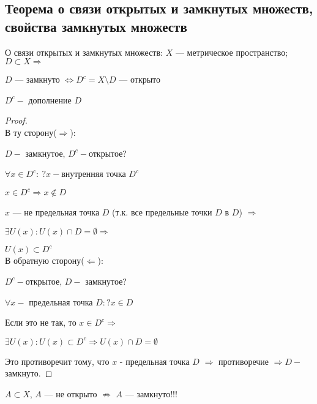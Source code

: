 \newpage
\subsection{Теорема о связи открытых и замкнутых множеств, свойства замкнутых множеств}
    \begin{theorem}{О связи открытых и замкнутых множеств:}
            $X$ --- метрическое пространство; $D \subset X \Rightarrow$
            
            $D$ --- замкнуто $ \Leftrightarrow D^{c} = X \setminus D$ ---  открыто
            
            $D^{c}-$ дополнение $D$
    \end{theorem}
    \begin{proof}$ $\\
    В ту сторону($\Rightarrow$):
    
        $D-$ замкнутое, $D^{c}-$открытое?
        
        $\forall x \in D^{c} : \  ? x-$внутренняя точка $D^{c}$
        
        $x \in D^{c} \Rightarrow  x \notin D$
        
        $x$ --- не предельная точка $D$ (т.к. все предельные точки $D$ в $D$) $\Rightarrow$
        
        $\exists U(x) : U(x) \cap D = \emptyset \Rightarrow$
    
        $U(x) \subset D^{c}$\\
    В обратную сторону($\Leftarrow$):
    
        $D^{c}-$открытое, $D-$ замкнутое?
        
        $\forall x -$ предельная точка $D: ? x \in D$
        
        Если это не так, то $x \in D^{c} \Rightarrow$
        
        $\exists U(x) : U(x) \subset D^{c} \Rightarrow U(x) \cap D = \emptyset$
        
        Это противоречит тому, что $x$ - предельная точка $D$ $\Rightarrow$ противоречие $\Rightarrow D-$замкнуто.
    \end{proof}
    \begin{remark}
        $A \subset X$, $A$ --- не открыто $\not \Rightarrow$ $A$ --- замкнуто!!!\\
    \end{remark}
    
